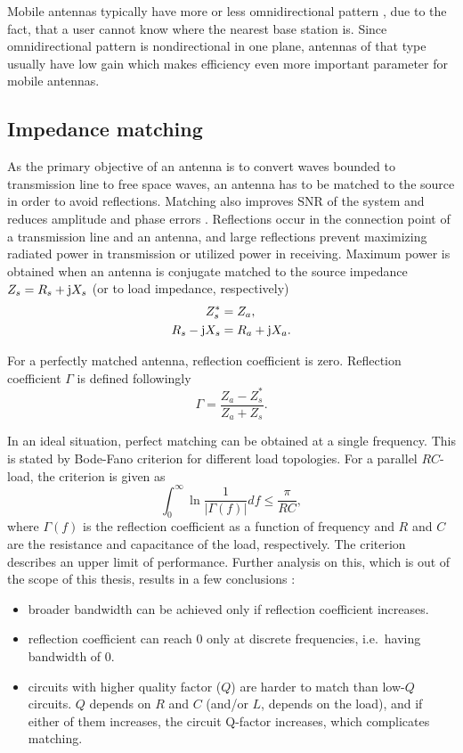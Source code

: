 Mobile antennas typically have more or less omnidirectional pattern \cite{ying_mobile_antennas}, due to the fact, that a user cannot know where the nearest base station is. Since omnidirectional pattern is nondirectional in one plane, antennas of that type usually have low gain which makes efficiency even more important parameter for mobile antennas.

\subsection{Impedance matching}
\label{sec:matching}
As the primary objective of an antenna is to convert waves bounded to transmission line to free space waves, an antenna has to be matched to the source in order to avoid reflections. Matching also improves SNR of the system and reduces amplitude and phase errors \cite{pozar}. Reflections occur in the connection point of a transmission line and an antenna, and large reflections prevent maximizing radiated power in transmission or utilized power in receiving. Maximum power is obtained when an antenna is conjugate matched \cite{stutzman} to the source impedance $Z_s=R_s+\mathrm{j} X_s$ (or to load impedance, respectively)
\begin{align}
\label{eq:matching1}
    Z_s^* &= Z_a,\\
\label{eq:matching2}
    R_s-\mathrm{j} X_s &= R_a+\mathrm{j} X_a.
\end{align}

For a perfectly matched antenna, reflection coefficient is zero. Reflection coefficient $\Gamma$ \cite{stutzman} is defined followingly
\begin{equation}
\label{eq:reflection_coeff}
    \Gamma = \frac{Z_a-Z_s^*}{Z_a+Z_s}.
\end{equation}

In an ideal situation, perfect matching can be obtained at a single frequency. This is stated by Bode-Fano criterion for different load topologies. For a parallel $RC$-load, the criterion \cite{pozar} is given as
\begin{equation}
    \int_0^\infty\ln\frac{1}{|\Gamma(f)|}df\leq\frac{\pi}{RC},
\end{equation}
where $\Gamma(f)$ is the reflection coefficient as a function of frequency and $R$ and $C$ are the resistance and capacitance of the load, respectively. The criterion describes an upper limit of performance. Further analysis on this, which is out of the scope of this thesis, results in a few conclusions \cite{pozar}:
\begin{itemize}
    \item broader bandwidth can be achieved only if reflection coefficient increases.
    \item reflection coefficient can reach 0 only at discrete frequencies, i.e.\ having bandwidth of 0.
    \item circuits with higher quality factor ($Q$) are harder to match than low-$Q$ circuits. $Q$ depends on $R$ and $C$ (and/or $L$, depends on the load), and if either of them increases, the circuit Q-factor increases, which complicates matching.
\end{itemize}

